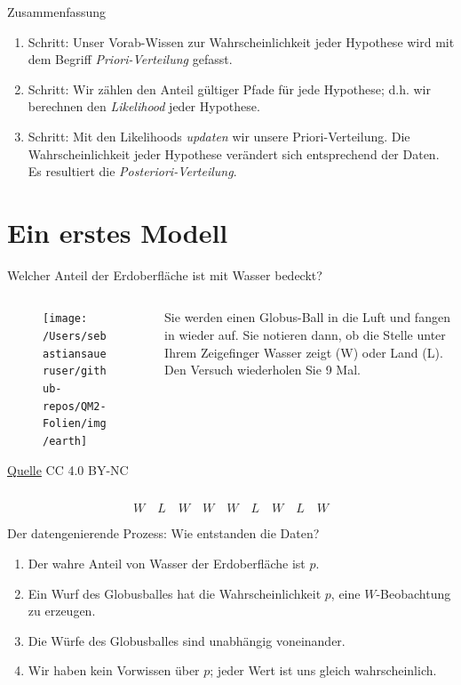 \documentclass[
  ngerman,
  ignorenonframetext,
]{beamer}
\providecommand{\tightlist}{%
  \setlength{\itemsep}{0pt}\setlength{\parskip}{0pt}}
\begin{document}
\begin{frame}{Zusammenfassung}
\protect\hypertarget{zusammenfassung}{}
\begin{enumerate}
\item
  Schritt: Unser Vorab-Wissen zur Wahrscheinlichkeit jeder Hypothese
  wird mit dem Begriff \emph{Priori-Verteilung} gefasst.
\item
  Schritt: Wir zählen den Anteil gültiger Pfade für jede Hypothese; d.h.
  wir berechnen den \emph{Likelihood} jeder Hypothese.
\item
  Schritt: Mit den Likelihoods \emph{updaten} wir unsere
  Priori-Verteilung. Die Wahrscheinlichkeit jeder Hypothese verändert
  sich entsprechend der Daten. Es resultiert die
  \emph{Posteriori-Verteilung}.
\end{enumerate}
\end{frame}

\hypertarget{ein-erstes-modell}{%
\section{Ein erstes Modell}\label{ein-erstes-modell}}

\begin{frame}{Welcher Anteil der Erdoberfläche ist mit Wasser bedeckt?}
\protect\hypertarget{welcher-anteil-der-erdoberfluxe4che-ist-mit-wasser-bedeckt}{}
\begin{columns}[T]
\begin{column}{0.3\textwidth}
\begin{figure}[H]
\texttt{[image: /Users/sebastiansaueruser/github-repos/QM2-Folien/img/earth]} \end{figure}
\tiny

\href{https://pngimg.com/image/25340}{Quelle} CC 4.0 BY-NC \normalsize
\end{column}

\begin{column}{0.7\textwidth}
Sie werden einen Globus-Ball in die Luft und fangen in wieder auf. Sie
notieren dann, ob die Stelle unter Ihrem Zeigefinger Wasser zeigt (W)
oder Land (L). Den Versuch wiederholen Sie 9 Mal.
\end{column}
\end{columns}

\[W \quad L \quad W \quad W \quad W \quad L \quad W \quad L \quad W\]
\end{frame}

\begin{frame}{Der datengenierende Prozess: Wie entstanden die Daten?}
\protect\hypertarget{der-datengenierende-prozess-wie-entstanden-die-daten}{}
\begin{enumerate}
\tightlist
\item
  Der wahre Anteil von Wasser der Erdoberfläche ist \(p\).
\item
  Ein Wurf des Globusballes hat die Wahrscheinlichkeit \(p\), eine
  \(W\)-Beobachtung zu erzeugen.
\item
  Die Würfe des Globusballes sind unabhängig voneinander.
\item
  Wir haben kein Vorwissen über \(p\); jeder Wert ist uns gleich
  wahrscheinlich.
\end{enumerate}
\end{frame}
\end{document}
